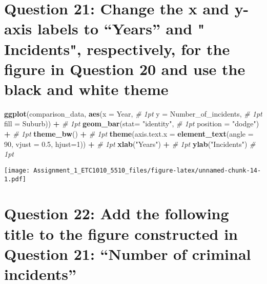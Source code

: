 \documentclass[
]{article}
\newenvironment{Shaded}{\begin{snugshade}}{\end{snugshade}}
\newcommand{\CommentTok}[1]{\textcolor[rgb]{0.56,0.35,0.01}{\textit{#1}}}
\newcommand{\DataTypeTok}[1]{\textcolor[rgb]{0.13,0.29,0.53}{#1}}
\newcommand{\DecValTok}[1]{\textcolor[rgb]{0.00,0.00,0.81}{#1}}
\newcommand{\FloatTok}[1]{\textcolor[rgb]{0.00,0.00,0.81}{#1}}
\newcommand{\KeywordTok}[1]{\textcolor[rgb]{0.13,0.29,0.53}{\textbf{#1}}}
\newcommand{\NormalTok}[1]{#1}
\newcommand{\OperatorTok}[1]{\textcolor[rgb]{0.81,0.36,0.00}{\textbf{#1}}}
\newcommand{\StringTok}[1]{\textcolor[rgb]{0.31,0.60,0.02}{#1}}
\begin{document}
\hypertarget{question-21-change-the-x-and-y-axis-labels-to-years-and-incidents-respectively-for-the-figure-in-question-20-and-use-the-black-and-white-theme}{%
\section{Question 21: Change the x and y-axis labels to ``Years'' and "
Incidents", respectively, for the figure in Question 20 and use the
black and white
theme}\label{question-21-change-the-x-and-y-axis-labels-to-years-and-incidents-respectively-for-the-figure-in-question-20-and-use-the-black-and-white-theme}}

\begin{Shaded}
\begin{Highlighting}[]
\KeywordTok{ggplot}\NormalTok{(comparison_data, }\KeywordTok{aes}\NormalTok{(}\DataTypeTok{x =}\NormalTok{ Year,     }\CommentTok{# 1pt}
                            \DataTypeTok{y =}\NormalTok{ Number_of_incidents,  }\CommentTok{# 1pt}
                            \DataTypeTok{fill =}\NormalTok{ Suburb)) }\OperatorTok{+}\StringTok{   }\CommentTok{# 1pt}
\StringTok{  }\KeywordTok{geom_bar}\NormalTok{(}\DataTypeTok{stat=} \StringTok{"identity"}\NormalTok{,    }\CommentTok{# 1pt}
             \DataTypeTok{position =} \StringTok{"dodge"}\NormalTok{) }\OperatorTok{+}\StringTok{  }\CommentTok{# 1pt}
\StringTok{  }\KeywordTok{theme_bw}\NormalTok{() }\OperatorTok{+}\StringTok{  }\CommentTok{# 1pt}
\KeywordTok{theme}\NormalTok{(}\DataTypeTok{axis.text.x =} \KeywordTok{element_text}\NormalTok{(}\DataTypeTok{angle =} \DecValTok{90}\NormalTok{, }\DataTypeTok{vjust =} \FloatTok{0.5}\NormalTok{, }\DataTypeTok{hjust=}\DecValTok{1}\NormalTok{)) }\OperatorTok{+}\StringTok{  }\CommentTok{# 1pt}
\StringTok{  }\KeywordTok{xlab}\NormalTok{(}\StringTok{"Years"}\NormalTok{) }\OperatorTok{+}\StringTok{  }\CommentTok{# 1pt}
\StringTok{  }\KeywordTok{ylab}\NormalTok{(}\StringTok{"Incidents"}\NormalTok{)  }\CommentTok{# 1pt}
\end{Highlighting}
\end{Shaded}

\texttt{[image: Assignment\_1\_ETC1010\_5510\_files/figure-latex/unnamed-chunk-14-1.pdf]}

\hypertarget{question-22-add-the-following-title-to-the-figure-constructed-in-question-21-number-of-criminal-incidents}{%
\section{Question 22: Add the following title to the figure constructed
in Question 21: ``Number of criminal
incidents''}\label{question-22-add-the-following-title-to-the-figure-constructed-in-question-21-number-of-criminal-incidents}}
\end{document}
